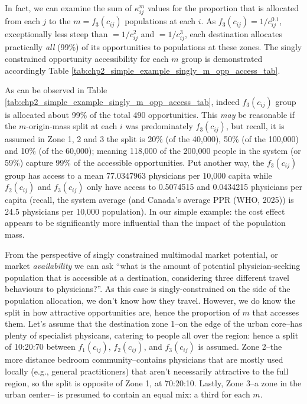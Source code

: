 \documentclass[
11pt, %
oneside, %
english, %
singlespacing, %
]{macthesis} %
\begin{document}
In fact, we can examine the sum of \(\kappa_{ij}^m\) values for the proportion that is allocated from each \(j\) to the \(m = f_3(c_{ij})\) populations at each \(i\). As \(f_3(c_{ij}) = 1/c_{ij}^0.1\), exceptionally less steep than \(= 1/c_{ij}^2\) and \(= 1/c_{ij}^3\), each destination allocates practically \emph{all} (99\%) of its opportunities to populations at these zones. The singly constrained opportunity accessibility for each \(m\) group is demonstrated accordingly Table \ref{tab:chp2_simple_example_singly_m_opp_access_tab}.



As can be observed in Table \ref{tab:chp2_simple_example_singly_m_opp_access_tab}, indeed \(f_3(c_{ij})\) group is allocated about 99\% of the total 490 opportunities. This \emph{may} be reasonable if the \(m\)-origin-mass split at each \(i\) was predominately \(f_3(c_{ij})\), but recall, it is assumed in Zone 1, 2 and 3 the split is 20\% (of the 40,000), 50\% (of the 100,000) and 10\% (of the 60,000); meaning 118,000 of the 200,000 people in the system (or 59\%) capture 99\% of the accessible opportunities. Put another way, the \(f_3(c_{ij})\) group has access to a mean 77.0347963 physicians per 10,000 capita while \(f_2(c_{ij})\) and \(f_3(c_{ij})\) only have access to 0.5074515 and 0.0434215 physicians per capita (recall, the system average (and Canada's average PPR (WHO, 2025)) is 24.5 physicians per 10,000 population). In our simple example: the cost effect appears to be significantly more influential than the impact of the population mass.

From the perspective of singly constrained multimodal market potential, or market \emph{availability} we can ask ``what is the amount of potential physician-seeking population that is accessible at a destination, considering three different travel behaviours to physicians?''. As this case is singly-constrained on the side of the population allocation, we don't know how they travel. However, we do know the split in how attractive opportunities are, hence the proportion of \(m\) that accesses them. Let's assume that the destination zone 1--on the edge of the urban core--has plenty of specialist physicans, catering to people all over the region: hence a split of 10:20:70 between \(f_1(c_{ij})\), \(f_2(c_{ij})\), and \(f_3(c_{ij})\) is assumed. Zone 2--the more distance bedroom community--contains physicians that are mostly used locally (e.g., general practitioners) that aren't necessarily attractive to the full region, so the split is opposite of Zone 1, at 70:20:10. Lastly, Zone 3--a zone in the urban center-- is presumed to contain an equal mix: a third for each \(m\).
\end{document}
